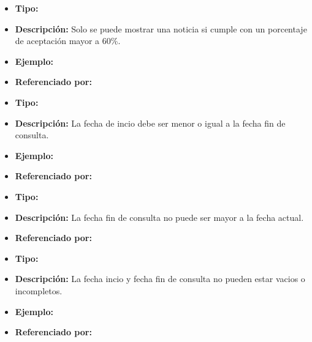 
  \begin{itemize}
    \item \textbf{Tipo:}  
    \item \textbf{Descripción:} Solo se puede mostrar una noticia si cumple con un porcentaje de aceptación mayor a 60\%.
    \item \textbf{Ejemplo:}
    \item \textbf{Referenciado por:}  \\
  \end{itemize}


  \begin{itemize}
    \item \textbf{Tipo:}  
    \item \textbf{Descripción:} La fecha de incio debe ser menor o igual a la fecha fin de consulta.
    \item \textbf{Ejemplo:}
    \item \textbf{Referenciado por:}  \\
  \end{itemize}



  \begin{itemize}
    \item \textbf{Tipo:}  
    \item \textbf{Descripción:} La fecha fin de consulta no puede ser mayor a la fecha actual.
    \item \textbf{Referenciado por:}  \\
  \end{itemize}


  \begin{itemize}
    \item \textbf{Tipo:}  
    \item \textbf{Descripción:} La fecha incio y fecha fin de consulta no pueden estar vacios o incompletos.
    \item \textbf{Ejemplo:}
    \item \textbf{Referenciado por:}  \\
  \end{itemize}

